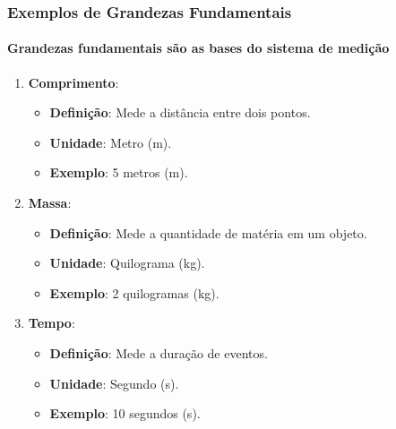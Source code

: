 \documentclass[12pt]{beamer}
\begin{document}
\begin{frame}
\frametitle{Exemplos de Grandezas Fundamentais}
\framesubtitle{Grandezas fundamentais são as bases do sistema de medição}

\begin{enumerate}
    \item \textbf{Comprimento}:
    \begin{itemize}
        \item \textbf{Definição}: Mede a distância entre dois pontos.
        \item \textbf{Unidade}: Metro (m).
        \item \textbf{Exemplo}: 5 metros (m).
    \end{itemize}

    \item \textbf{Massa}:
    \begin{itemize}
        \item \textbf{Definição}: Mede a quantidade de matéria em um objeto.
        \item \textbf{Unidade}: Quilograma (kg).
        \item \textbf{Exemplo}: 2 quilogramas (kg).
    \end{itemize}

    \item \textbf{\textbf{Tempo}}:
    \begin{itemize}
        \item \textbf{Definição}: Mede a duração de eventos.
        \item \textbf{Unidade}: Segundo (s).
        \item \textbf{Exemplo}: 10 segundos (s).
    \end{itemize}
\end{enumerate}
\end{frame}
\end{document}
